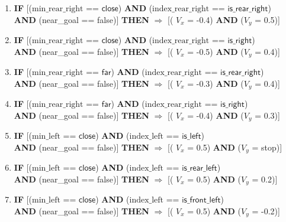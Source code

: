 \begin{enumerate}
	\item \textbf{IF} [($\text{min\_rear\_right}$ == $\textsf{close}$) \textbf{AND} ($\text{index\_rear\_right}$ == $\textsf{is\_rear\_right}$)\\
	\textbf{AND} (near\_goal == \textsf{false})]
	\textbf{THEN} $\Rightarrow$ [( $V_x$ = \textsf{-0.4}) \textbf{AND} ($V_y$ = \textsf{0.5})]	
	
	\item \textbf{IF} [($\text{min\_rear\_right}$ == $\textsf{close}$) \textbf{AND} ($\text{index\_rear\_right}$ == $\textsf{is\_right}$)\\
	\textbf{AND} (near\_goal == \textsf{false})]
	\textbf{THEN} $\Rightarrow$ [( $V_x$ = \textsf{-0.5}) \textbf{AND} ($V_y$ = \textsf{0.4})]
	
	\item \textbf{IF} [($\text{min\_rear\_right}$ == $\textsf{far}$) \textbf{AND} ($\text{index\_rear\_right}$ == $\textsf{is\_rear\_right}$)\\
	\textbf{AND} (near\_goal == \textsf{false})]
	\textbf{THEN} $\Rightarrow$ [( $V_x$ = \textsf{-0.3}) \textbf{AND} ($V_y$ = \textsf{0.4})]
	
	\item \textbf{IF} [($\text{min\_rear\_right}$ == $\textsf{far}$) \textbf{AND} ($\text{index\_rear\_right}$ == $\textsf{is\_right}$)\\
	\textbf{AND} (near\_goal == \textsf{false})]
	\textbf{THEN} $\Rightarrow$ [( $V_x$ = \textsf{-0.4}) \textbf{AND} ($V_y$ = \textsf{0.3})]
	
	\item \textbf{IF} [($\text{min\_left}$ == $\textsf{close}$) \textbf{AND} ($\text{index\_left}$ == $\textsf{is\_left}$)\\
	\textbf{AND} (near\_goal == \textsf{false})]
	\textbf{THEN} $\Rightarrow$ [( $V_x$ = \textsf{0.5}) \textbf{AND} ($V_y$ = \textsf{stop})]
	
	\item \textbf{IF} [($\text{min\_left}$ == $\textsf{close}$) \textbf{AND} ($\text{index\_left}$ == $\textsf{is\_rear\_left}$)\\
	\textbf{AND} (near\_goal == \textsf{false})]
	\textbf{THEN} $\Rightarrow$ [( $V_x$ = \textsf{0.5}) \textbf{AND} ($V_y$ = \textsf{0.2})]
	
	\item \textbf{IF} [($\text{min\_left}$ == $\textsf{close}$) \textbf{AND} ($\text{index\_left}$ == $\textsf{is\_front\_left}$)\\
	\textbf{AND} (near\_goal == \textsf{false})]
	\textbf{THEN} $\Rightarrow$ [( $V_x$ = \textsf{0.5}) \textbf{AND} ($V_y$ = \textsf{-0.2})]
	

\end{enumerate}
